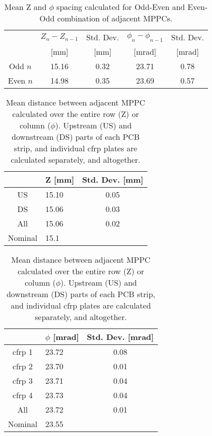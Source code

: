 \begin{table}
\centering
\begin{tabular}{ccccc}
 & $Z_{n}-Z_{n-1}$ &Std. Dev.& $\phi_{n}-\phi_{n-1}$ & Std. Dev. \\
 & [mm] &[mm]& [mrad]& [mrad]\\
\hline
Odd  $n$ & 15.16 & 0.32 & 23.71 & 0.78 \\ 
Even $n$ & 14.98 & 0.35 & 23.69 & 0.57 \\ 
\end{tabular}
\caption{Mean Z and $\phi$ spacing calculated for Odd-Even and Even-Odd
combination  of adjacent MPPCs.}
\label{tab:oddeven}
\end{table}

\begin{table}
\centering
\begin{tabular}{clc}
   & Z [mm] &Std. Dev. [mm] \\
\hline
US     & 15.10 & 0.05  \\
DS     & 15.06 & 0.03  \\
All    & 15.06 & 0.02  \\
Nominal& 15.1      &
\end{tabular}

\begin{tabular}{clc}
   & $\phi$ [mrad] &Std. Dev. [mrad] \\
\hline
cfrp 1     & 23.72 & 0.08  \\
cfrp 2     & 23.70 & 0.01  \\
cfrp 3     & 23.71 & 0.04  \\
cfrp 4     & 23.73 & 0.04  \\
All        & 23.72 & 0.01  \\
Nominal    & 23.55 &     
\end{tabular}
\label{tab:avgspacing}
\caption{Mean distance between adjacent MPPC calculated over the entire row (Z) or 
column ($\phi$). Upstream (US) and downstream (DS) parts of each PCB strip, and
individual cfrp plates are calculated separately, and altogether.}
\end{table}


